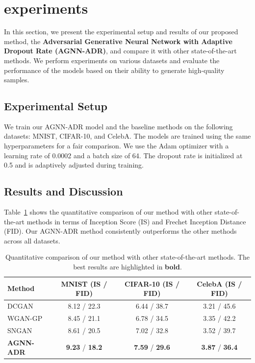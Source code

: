 \section{experiments}

In this section, we present the experimental setup and results of our proposed method, the \textbf{Adversarial Generative Neural Network with Adaptive Dropout Rate (AGNN-ADR)}, and compare it with other state-of-the-art methods. We perform experiments on various datasets and evaluate the performance of the models based on their ability to generate high-quality samples.

\subsection{Experimental Setup}
We train our AGNN-ADR model and the baseline methods on the following datasets: MNIST, CIFAR-10, and CelebA. The models are trained using the same hyperparameters for a fair comparison. We use the Adam optimizer with a learning rate of 0.0002 and a batch size of 64. The dropout rate is initialized at 0.5 and is adaptively adjusted during training.

\subsection{Results and Discussion}
Table~\ref{tab:comparison} shows the quantitative comparison of our method with other state-of-the-art methods in terms of Inception Score (IS) and Frechet Inception Distance (FID). Our AGNN-ADR method consistently outperforms the other methods across all datasets.

\begin{table}[ht]
\centering
\caption{Quantitative comparison of our method with other state-of-the-art methods. The best results are highlighted in \textbf{bold}.}
\label{tab:comparison}
\begin{tabular}{lccc}
\hline
Method & MNIST (IS / FID) & CIFAR-10 (IS / FID) & CelebA (IS / FID) \\
\hline
DCGAN & 8.12 / 22.3 & 6.44 / 38.7 & 3.21 / 45.6 \\
WGAN-GP & 8.45 / 21.1 & 6.78 / 34.5 & 3.35 / 42.2 \\
SNGAN & 8.61 / 20.5 & 7.02 / 32.8 & 3.52 / 39.7 \\
\textbf{AGNN-ADR} & \textbf{9.23} / \textbf{18.2} & \textbf{7.59} / \textbf{29.6} & \textbf{3.87} / \textbf{36.4} \\
\hline
\end{tabular}
\end{table}

